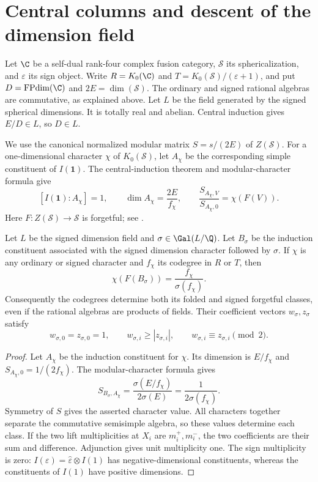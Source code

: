\section{Central columns and descent of the dimension field}\label{sec:central-columns}

Let $\C$ be a self-dual rank-four complex fusion category,
$\mathcal S$ its sphericalization, and $\varepsilon$ its sign object.
Write $R=K_0(\C)$ and
$T=K_0(\mathcal S)/(\varepsilon+1)$, and put
$D=\operatorname{FPdim}(\C)$ and
$2E=\dim(\mathcal S)$. The ordinary and signed rational algebras
are commutative, as explained above. Let $L$ be the field generated
by the signed spherical dimensions. It is totally real and abelian.
Central induction gives $E/D\in L$, so $D\in L$.

We use the canonical normalized modular matrix
$S=s/(2E)$ of $Z(\mathcal S)$. For a one-dimensional character
$\chi$ of $K_0(\mathcal S)$, let $A_\chi$ be the corresponding
simple constituent of $I(\mathbf1)$. The central-induction theorem
and modular-character formula give
\begin{equation}\label{col:eq:central-column-character}
 [I(\mathbf1):A_\chi]=1,\qquad
 \dim A_\chi=\frac{2E}{f_\chi},\qquad
 \frac{S_{A_\chi,V}}{S_{A_\chi,0}}=\chi(F(V)).
\end{equation}
Here $F:Z(\mathcal S)\to\mathcal S$ is forgetful; see
\cite[Example~2.9 and Theorem~2.13]{Ostrik3}.

\begin{proposition}\label{col:prop:simultaneous-columns}
Let $L$ be the signed dimension field and $\sigma\in\Gal(L/\Q)$.
Let $B_\sigma$ be the induction constituent associated with the signed
dimension character followed by $\sigma$. If $\chi$ is any ordinary
or signed character and $f_\chi$ its codegree in $R$ or $T$, then
\[
\chi(F(B_\sigma))=\frac{f_\chi}{\sigma(f_\chi)}.
\]
Consequently the codegrees determine both its folded and signed
forgetful classes, even if the rational algebras are products of fields.
Their coefficient vectors $w_\sigma,z_\sigma$ satisfy
\[
w_{\sigma,0}=z_{\sigma,0}=1,\qquad
w_{\sigma,i}\ge |z_{\sigma,i}|,\qquad
w_{\sigma,i}\equiv z_{\sigma,i}\pmod2.
\]
\end{proposition}
\begin{proof}
Let $A_\chi$ be the induction constituent for $\chi$. Its dimension
is $E/f_\chi$ and $S_{A_\chi,0}=1/(2f_\chi)$. The modular-character
formula gives
\[
S_{B_\sigma,A_\chi}
=\frac{\sigma(E/f_\chi)}{2\sigma(E)}
=\frac1{2\sigma(f_\chi)}.
\]
Symmetry of $S$ gives the asserted character value. All characters
together separate the commutative semisimple algebra, so these values
determine each class. If the two lift multiplicities at $X_i$ are
$m_i^+,m_i^-$, the two coefficients are their sum and difference.
Adjunction gives unit multiplicity one. The sign multiplicity is zero:
$I(\varepsilon)=\widehat\varepsilon\otimes I(1)$ has negative-dimensional
constituents, whereas the constituents of $I(1)$ have positive dimensions.
\end{proof}

